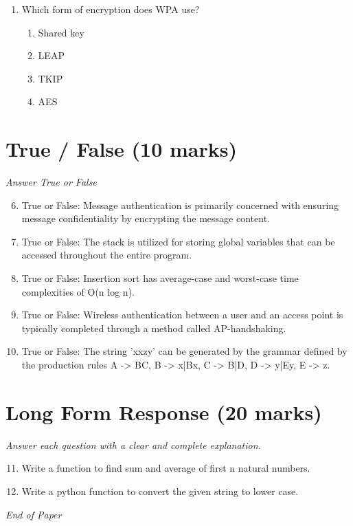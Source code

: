 \documentclass[12pt]{article}
\begin{document}
\begin{enumerate}[label=\arabic*.]
\begin{enumerate}[label=(\alph*)]
    \item Physical layer
    \item Data-link Layer
    \item Session layer
    \item Presentation layer
\end{enumerate}
\item Which form of encryption does WPA use?
\begin{enumerate}[label=(\alph*)]
    \item Shared key
    \item LEAP
    \item TKIP
    \item AES
\end{enumerate}
\end{enumerate}

\section*{True / False (10 marks)}
\textit{Answer True or False}
\begin{enumerate}[label=\arabic*.]
\setcounter{enumi}{5}
\item True or False: Message authentication is primarily concerned with ensuring message confidentiality by encrypting the message content.
\item True or False: The stack is utilized for storing global variables that can be accessed throughout the entire program.
\item True or False: Insertion sort has average-case and worst-case time complexities of O(n log n).
\item True or False: Wireless authentication between a user and an access point is typically completed through a method called AP-handshaking.
\item True or False: The string 'xxzy' can be generated by the grammar defined by the production rules A -\textgreater{} BC, B -\textgreater{} x|Bx, C -\textgreater{} B|D, D -\textgreater{} y|Ey, E -\textgreater{} z.
\end{enumerate}

\section*{Long Form Response (20 marks)}
\textit{Answer each question with a clear and complete explanation.}
\begin{enumerate}[label=\arabic*.]
\setcounter{enumi}{10}
\item Write a function to find sum and average of first n natural numbers.
\item Write a python function to convert the given string to lower case.
\end{enumerate}

\vfill
\noindent\textit{End of Paper}
\end{document}

